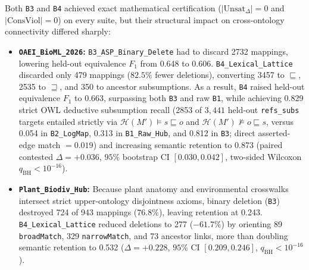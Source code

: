 \documentclass[10pt]{article}
\theoremstyle{accentdef}
\newcommand{\ClaspOAEIBioMLVsBThreeMean}{0.036}
\newcommand{\ClaspOAEIBioMLVsBThreeLow}{0.030}
\newcommand{\ClaspOAEIBioMLVsBThreeHigh}{0.042}
\newcommand{\ClaspOAEIBioMLBRawHubEquivFone}{0.648}
\newcommand{\ClaspOAEIBioMLBRawHubDedSubRecall}{0.313}
\newcommand{\ClaspOAEIBioMLBLogMapRepairDedSubRecall}{0.054}
\newcommand{\ClaspOAEIBioMLBASPBinaryDeleteEquivFone}{0.606}
\newcommand{\ClaspOAEIBioMLBASPBinaryDeleteDedSubRecall}{0.812}
\newcommand{\ClaspOAEIBioMLBASPBinaryDeleteDropped}{2732}
\newcommand{\ClaspOAEIBioMLBLexicalLatticeRetention}{0.873}
\newcommand{\ClaspOAEIBioMLBLexicalLatticeEquivFone}{0.663}
\newcommand{\ClaspOAEIBioMLBLexicalLatticeSubRecall}{0.019}
\newcommand{\ClaspOAEIBioMLBLexicalLatticeDedSubRecall}{0.829}
\newcommand{\ClaspOAEIBioMLBLexicalLatticeDedSubTP}{2853}
\newcommand{\ClaspOAEIBioMLBLexicalLatticeDowngradeSub}{3457}
\newcommand{\ClaspOAEIBioMLBLexicalLatticeDowngradeSup}{2535}
\newcommand{\ClaspOAEIBioMLBLexicalLatticeWeakenAncestor}{350}
\newcommand{\ClaspOAEIBioMLBLexicalLatticeDropped}{479}
\newcommand{\ClaspPlantBiodivHubMappings}{943}
\newcommand{\ClaspPlantBiodivHubVsBThreeMean}{0.228}
\newcommand{\ClaspPlantBiodivHubVsBThreeLow}{0.209}
\newcommand{\ClaspPlantBiodivHubVsBThreeHigh}{0.246}
\newcommand{\ClaspPlantBiodivHubBASPBinaryDeleteRetention}{0.243}
\newcommand{\ClaspPlantBiodivHubBASPBinaryDeleteDropped}{724}
\newcommand{\ClaspPlantBiodivHubBLexicalLatticeRetention}{0.532}
\newcommand{\ClaspPlantBiodivHubBLexicalLatticeDowngradeSub}{89}
\newcommand{\ClaspPlantBiodivHubBLexicalLatticeDowngradeSup}{329}
\newcommand{\ClaspPlantBiodivHubBLexicalLatticeWeakenAncestor}{73}
\newcommand{\ClaspPlantBiodivHubBLexicalLatticeDropped}{277}
\begin{document}
Both \texttt{B3} and \texttt{B4} achieved exact mathematical certification ($|\mathrm{Unsat}_{\Delta}| = 0$ and $|\mathrm{ConsViol}| = 0$) on every suite, but their structural impact on cross-ontology connectivity differed sharply:
\begin{itemize}
  \item \textbf{\texttt{OAEI\_BioML\_2026}:} \texttt{B3\_ASP\_Binary\_Delete} had to discard \num{\ClaspOAEIBioMLBASPBinaryDeleteDropped} mappings, lowering held-out equivalence $F_1$ from \ClaspOAEIBioMLBRawHubEquivFone{} to \ClaspOAEIBioMLBASPBinaryDeleteEquivFone{}. \texttt{B4\_Lexical\_Lattice} discarded only \num{\ClaspOAEIBioMLBLexicalLatticeDropped} mappings ($82.5\%$ fewer deletions), converting \num{\ClaspOAEIBioMLBLexicalLatticeDowngradeSub} to $\sqsubseteq$, \num{\ClaspOAEIBioMLBLexicalLatticeDowngradeSup} to $\sqsupseteq$, and \num{\ClaspOAEIBioMLBLexicalLatticeWeakenAncestor} to ancestor subsumptions. As a result, \texttt{B4} raised held-out equivalence $F_1$ to \ClaspOAEIBioMLBLexicalLatticeEquivFone{}, surpassing both \texttt{B3} and raw \texttt{B1}, while achieving \ClaspOAEIBioMLBLexicalLatticeDedSubRecall{} strict OWL deductive subsumption recall (\num{\ClaspOAEIBioMLBLexicalLatticeDedSubTP} of $3{,}441$ held-out \texttt{refs\_subs} targets entailed strictly via $\mathcal{H}(M') \models s \sqsubseteq o$ and $\mathcal{H}(M') \not\models o \sqsubseteq s$, versus \ClaspOAEIBioMLBLogMapRepairDedSubRecall{} in \texttt{B2\_LogMap}, \ClaspOAEIBioMLBRawHubDedSubRecall{} in \texttt{B1\_Raw\_Hub}, and \ClaspOAEIBioMLBASPBinaryDeleteDedSubRecall{} in \texttt{B3}; direct asserted-edge match $= \ClaspOAEIBioMLBLexicalLatticeSubRecall{}$) and increasing semantic retention to \ClaspOAEIBioMLBLexicalLatticeRetention{} (paired contested $\Delta = +\ClaspOAEIBioMLVsBThreeMean{}$, $95\%$ bootstrap CI $[\ClaspOAEIBioMLVsBThreeLow{}, \ClaspOAEIBioMLVsBThreeHigh{}]$, two-sided Wilcoxon $q_{\mathrm{BH}} < 10^{-16}$).
  \item \textbf{\texttt{Plant\_Biodiv\_Hub}:} Because plant anatomy and environmental crosswalks intersect strict upper-ontology disjointness axioms, binary deletion (\texttt{B3}) destroyed \num{\ClaspPlantBiodivHubBASPBinaryDeleteDropped} of \num{\ClaspPlantBiodivHubMappings} mappings ($76.8\%$), leaving retention at \ClaspPlantBiodivHubBASPBinaryDeleteRetention{}. \texttt{B4\_Lexical\_Lattice} reduced deletions to \num{\ClaspPlantBiodivHubBLexicalLatticeDropped} ($-61.7\%$) by orienting \num{\ClaspPlantBiodivHubBLexicalLatticeDowngradeSub} \texttt{broadMatch}, \num{\ClaspPlantBiodivHubBLexicalLatticeDowngradeSup} \texttt{narrowMatch}, and \num{\ClaspPlantBiodivHubBLexicalLatticeWeakenAncestor} ancestor links, more than doubling semantic retention to \ClaspPlantBiodivHubBLexicalLatticeRetention{} ($\Delta = +\ClaspPlantBiodivHubVsBThreeMean{}$, $95\%$ CI $[\ClaspPlantBiodivHubVsBThreeLow{}, \ClaspPlantBiodivHubVsBThreeHigh{}]$, $q_{\mathrm{BH}} < 10^{-16}$).

\end{itemize}
\end{document}
